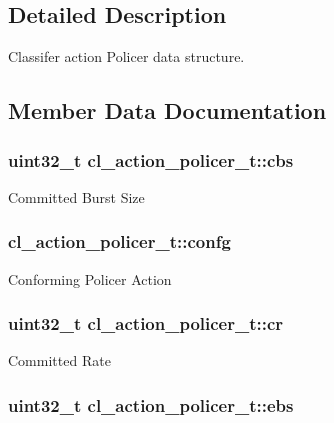 \subsection{Detailed Description}
Classifer action Policer data structure. 

\subsection{Member Data Documentation}
\hypertarget{structcl__action__policer__t_ade7a7f8d4ae3cb3c3b04ea3a291fd450}{
\subsubsection[{cbs}]{\setlength{\rightskip}{0pt plus 5cm}uint32\-\_\-t cl\-\_\-action\-\_\-policer\-\_\-t\-::cbs}}\label{structcl__action__policer__t_ade7a7f8d4ae3cb3c3b04ea3a291fd450}
Committed Burst Size \hypertarget{structcl__action__policer__t_aaccf90075204c956c1a3ae1b45f84749}{
\subsubsection[{confg}]{ cl\-\_\-action\-\_\-policer\-\_\-t\-::confg}}\label{structcl__action__policer__t_aaccf90075204c956c1a3ae1b45f84749}
Conforming Policer Action \hypertarget{structcl__action__policer__t_a6b328b9dd494fa3298e8ef598edb5245}{
\subsubsection[{cr}]{\setlength{\rightskip}{0pt plus 5cm}uint32\-\_\-t cl\-\_\-action\-\_\-policer\-\_\-t\-::cr}}\label{structcl__action__policer__t_a6b328b9dd494fa3298e8ef598edb5245}
Committed Rate \hypertarget{structcl__action__policer__t_a622f9bacf5e0490b900e8edc8f9cf05f}{
\subsubsection[{ebs}]{\setlength{\rightskip}{0pt plus 5cm}uint32\-\_\-t cl\-\_\-action\-\_\-policer\-\_\-t\-::ebs}}\label{structcl__action__policer__t_a622f9bacf5e0490b900e8edc8f9cf05f}
